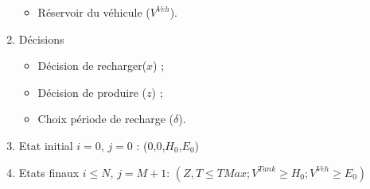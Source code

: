 \documentclass[hyperref={bookmarks=false},aspectratio=169]{beamer}
\begin{document}
\begin{frame}
\begin{minipage}{.6\textwidth}
\begin{enumerate}
\begin{itemize}
\item Réservoir du véhicule ($V^{Veh}$).



\end{itemize}
\item Décisions %
\begin{itemize}
\item Décision de recharger($x$) ;
\item Décision de produire ($z$) ;
\item Choix période de recharge ($\delta$).
\end{itemize}

\item Etat initial $i=0$, $j=0$ : (0,0,$H_0$,$E_0$)
\item Etats finaux $i\leq N$, $ j=M+1$: $(Z,T\leq TMax; V^{Tank} \geq H_0; V^{Veh} \geq E_0)$ %

\end{enumerate}
\end{minipage}%

\end{frame}
\end{document}
